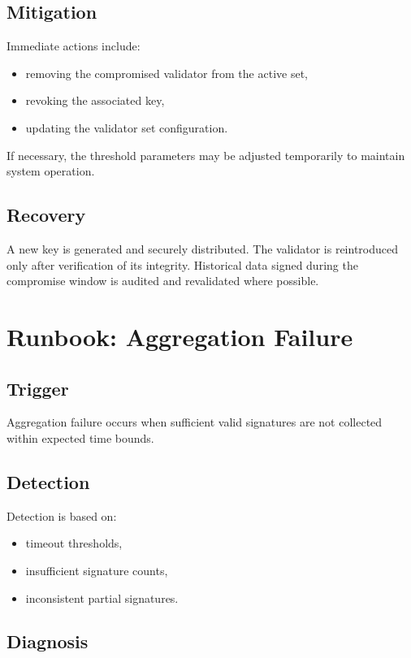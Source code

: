 \subsection{Mitigation}

Immediate actions include:
\begin{itemize}
\item removing the compromised validator from the active set,
\item revoking the associated key,
\item updating the validator set configuration.
\end{itemize}

If necessary, the threshold parameters may be adjusted temporarily to maintain system operation.

\subsection{Recovery}

A new key is generated and securely distributed. The validator is reintroduced only after verification of its integrity. Historical data signed during the compromise window is audited and revalidated where possible.

\section{Runbook: Aggregation Failure}

\subsection{Trigger}

Aggregation failure occurs when sufficient valid signatures are not collected within expected time bounds.

\subsection{Detection}

Detection is based on:
\begin{itemize}
\item timeout thresholds,
\item insufficient signature counts,
\item inconsistent partial signatures.
\end{itemize}

\subsection{Diagnosis}

